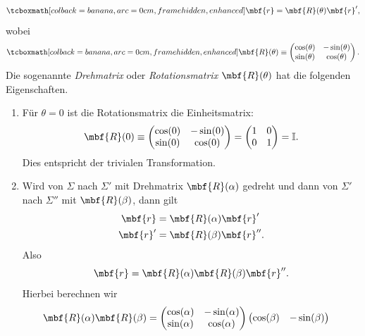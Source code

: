 \begin{equation}
  \eqbox{\mbf{r} = \mbf{R}(\theta )\mbf{r}',}
\end{equation}
wobei
\begin{equation}
  \eqbox{\mbf{R}(\theta ) \equiv \begin{pmatrix}
    \cos(\theta) & -\sin(\theta) \\ 
    \sin(\theta) & \cos(\theta) 
  \end{pmatrix}.}
\end{equation}
Die sogenannte \emph{Drehmatrix} oder \emph{Rotationsmatrix} $\mbf{R}(\theta )$ hat die folgenden Eigenschaften.
\begin{enumerate}
  \item Für $\theta=0$ ist die Rotationsmatrix die Einheitsmatrix:
  \begin{equation}
    \mbf{R}(0) \equiv \begin{pmatrix}
    \cos(0) & -\sin(0) \\ 
    \sin(0) & \cos(0) 
  \end{pmatrix} = \begin{pmatrix}
    1 & 0 \\ 
    0 & 1 
  \end{pmatrix} = \mathbb{I}.
  \end{equation}
  Dies entspricht der trivialen Transformation.
  \item Wird von $\Sigma$ nach $\Sigma'$ mit Drehmatrix $\mbf{R}(\alpha)$ gedreht und dann von $\Sigma'$ nach $\Sigma''$ mit $\mbf{R}(\beta)$, dann gilt
  \begin{equation}
    \begin{split}
      \mbf{r} &= \mbf{R}(\alpha)\mbf{r}' \\
      \mbf{r}' &= \mbf{R}(\beta)\mbf{r}''.
    \end{split}
  \end{equation}
  Also 
  \begin{equation}
      \mbf{r} = \mbf{R}(\alpha)\mbf{R}(\beta)\mbf{r}''.
  \end{equation}
  Hierbei berechnen wir
  \begin{equation}
    \begin{split}
      \mbf{R}(\alpha)\mbf{R}(\beta) &= \begin{pmatrix}
    \cos(\alpha) & -\sin(\alpha) \\ 
    \sin(\alpha) & \cos(\alpha) 
  \end{pmatrix}\begin{pmatrix}
    \cos(\beta) & -\sin(\beta) \\ 

\end{pmatrix}
\end{split}
\end{equation}
\end{enumerate}
